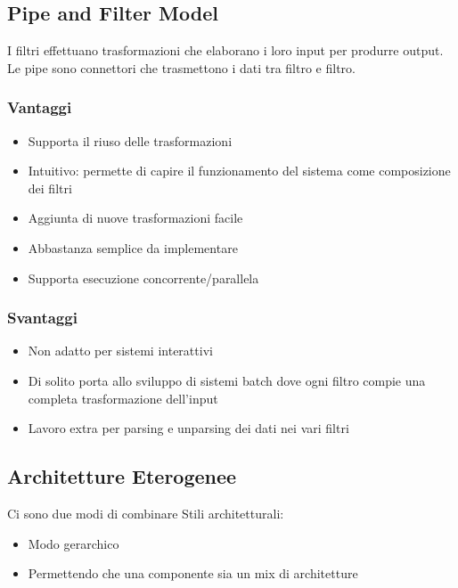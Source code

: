 \break
\subsection{Pipe and Filter Model}
I filtri effettuano trasformazioni che elaborano i loro input per produrre output.\\
Le pipe sono connettori che trasmettono i dati tra filtro e filtro.

\subsubsection{Vantaggi}
\begin{itemize}
    \item Supporta il riuso delle trasformazioni
    \item Intuitivo: permette di capire il funzionamento del sistema come composizione dei filtri
    \item Aggiunta di nuove trasformazioni facile
    \item Abbastanza semplice da implementare
    \item Supporta esecuzione concorrente/parallela
\end{itemize}

\subsubsection{Svantaggi}
\begin{itemize}
    \item Non adatto per sistemi interattivi
    \item Di solito porta allo sviluppo di sistemi batch dove ogni filtro compie una completa trasformazione dell’input
    \item Lavoro extra per parsing e unparsing dei dati nei vari filtri
\end{itemize}

\subsection{Architetture Eterogenee}
Ci sono due modi di combinare Stili architetturali:
\begin{itemize}
    \item Modo gerarchico
    \item Permettendo che una componente sia un mix di architetture
\end{itemize}